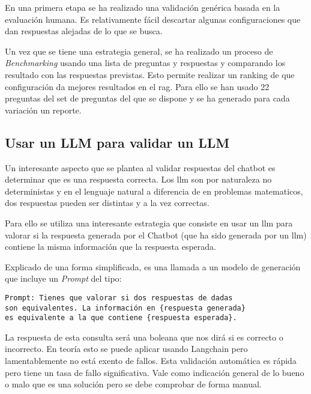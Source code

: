 En una primera etapa se ha realizado una validación genérica basada en la evaluación humana. Es relativamente fácil descartar algunas configuraciones que dan respuestas alejadas de lo que se busca.

Un vez que se tiene una estrategia general, se ha realizado un proceso de \textit{Benchmarking} usando una lista de preguntas y respuestas y comparando los resultado con las respuestas previstas. Esto permite realizar un ranking de que configuración da mejores resultados en el \acrshort{rag}. Para ello se han usado 22 preguntas del set de preguntas del que se dispone y se ha generado para cada variación un reporte.


\subsection{Usar un LLM para validar un LLM}

Un interesante aspecto que se plantea al validar respuestas del chatbot es determinar que es una respuesta correcta. Los \acrshort{llm} son por naturaleza no deterministas y en el lenguaje natural a diferencia de en problemas matematicos, dos respuestas pueden ser distintas y a la vez correctas. 

Para ello se utiliza una interesante estrategia que consiste en usar un \acrshort{llm} para valorar si la respuesta generada por el Chatbot (que ha sido generada por un \acrshort{llm}) contiene la misma información que la respuesta esperada.

Explicado de una forma simplificada, es una llamada a un modelo de generación que incluye un \textit{Prompt} del tipo:

\begin{verbatim}
Prompt: Tienes que valorar si dos respuestas de dadas 
son equivalentes. La información en {respuesta generada} 
es equivalente a la que contiene {respuesta esperada}.
\end{verbatim}

La respuesta de esta consulta será una boleana que nos dirá si es correcto o incorrecto. En teoría esto se puede aplicar usando Langchain pero lamentablemente no está exento de fallos. Esta validación automática es rápida pero tiene un tasa de fallo significativa. Vale como indicación general de lo bueno o malo que es una solución pero se debe comprobar de forma manual.

